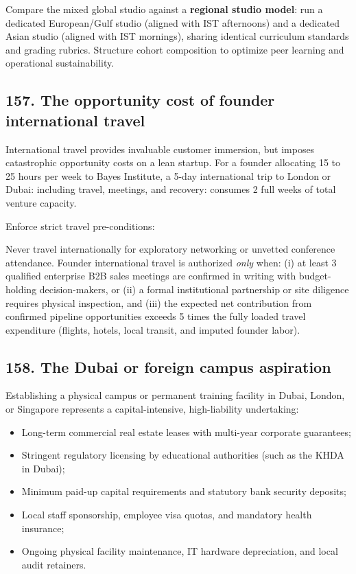 Compare the mixed global studio against a \textbf{regional studio model}: run a dedicated European/Gulf studio (aligned with IST afternoons) and a dedicated Asian studio (aligned with IST mornings), sharing identical curriculum standards and grading rubrics. Structure cohort composition to optimize peer learning and operational sustainability.

\subsection{157. The opportunity cost of founder international travel}

International travel provides invaluable customer immersion, but imposes catastrophic opportunity costs on a lean startup. For a founder allocating 15 to 25 hours per week to Bayes Institute, a 5-day international trip to London or Dubai: including travel, meetings, and recovery: consumes 2 full weeks of total venture capacity.

Enforce strict travel pre-conditions:
\begin{tcolorbox}[colback=BayesCanvas,colframe=BayesSecondary,arc=1mm,title=\textbf{The International Travel Hurdle Protocol}]
Never travel internationally for exploratory networking or unvetted conference attendance. Founder international travel is authorized \textit{only} when: (i) at least 3 qualified enterprise B2B sales meetings are confirmed in writing with budget-holding decision-makers, or (ii) a formal institutional partnership or site diligence requires physical inspection, and (iii) the expected net contribution from confirmed pipeline opportunities exceeds 5 times the fully loaded travel expenditure (flights, hotels, local transit, and imputed founder labor).
\end{tcolorbox}

\subsection{158. The Dubai or foreign campus aspiration}

Establishing a physical campus or permanent training facility in Dubai, London, or Singapore represents a capital-intensive, high-liability undertaking:
\begin{itemize}
    \item Long-term commercial real estate leases with multi-year corporate guarantees;
    \item Stringent regulatory licensing by educational authorities (such as the KHDA in Dubai);
    \item Minimum paid-up capital requirements and statutory bank security deposits;
    \item Local staff sponsorship, employee visa quotas, and mandatory health insurance;
    \item Ongoing physical facility maintenance, IT hardware depreciation, and local audit retainers.
\end{itemize}

